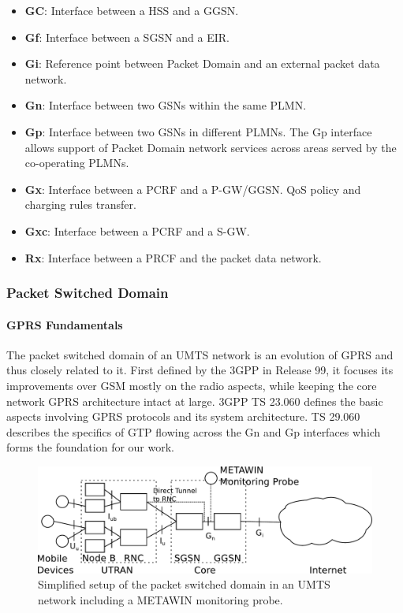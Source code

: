 \begin{itemize}
\item \textbf{GC}: Interface between a HSS and a GGSN.
\item \textbf{Gf}: Interface between a SGSN and a EIR.
\item \textbf{Gi}: Reference point between Packet Domain and an external packet data network.
\item \textbf{Gn}: Interface between two GSNs within the same PLMN.
\item \textbf{Gp}: Interface between two GSNs in different PLMNs. The Gp interface allows support of Packet Domain network services across areas served by the co-operating PLMNs.
\item \textbf{Gx}: Interface between a PCRF and a P-GW/GGSN. QoS policy and charging rules transfer.
\item \textbf{Gxc}: Interface between a PCRF and a S-GW.

\item \textbf{Rx}: Interface between a PRCF and the packet data network.
\end{itemize}


\subsubsection{Packet Switched Domain}



\paragraph{GPRS Fundamentals}

The packet switched domain of an \gls{UMTS} network is an evolution of \gls{GPRS} and thus closely related to it. First defined by the \gls{3GPP} in Release 99, it focuses its improvements over \gls{GSM} mostly on the radio aspects, while keeping the core network \gls{GPRS} architecture intact at large. \gls{3GPP} \gls{TS} 23.060 \cite{3gpp.23.060} defines the basic aspects involving \gls{GPRS} protocols and its system architecture. \gls{TS} 29.060 \cite{3gpp.29.060} describes the specifics of \gls{GTP} flowing across the Gn and Gp interfaces which forms the foundation for our work.

\begin{figure}[htb]
	\centering
	\includegraphics[width=1.0\textwidth]{images/umts-network.pdf}
	\caption{Simplified setup of the packet switched domain in an \acrshort{UMTS} network including a METAWIN monitoring probe.}
	\label{c4:fig:umtsnetwork}
\end{figure}

